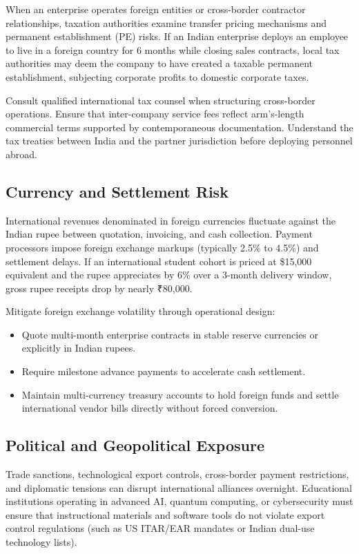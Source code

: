 When an enterprise operates foreign entities or cross-border contractor relationships, taxation authorities examine transfer pricing mechanisms and permanent establishment (PE) risks. If an Indian enterprise deploys an employee to live in a foreign country for 6 months while closing sales contracts, local tax authorities may deem the company to have created a taxable permanent establishment, subjecting corporate profits to domestic corporate taxes.

Consult qualified international tax counsel when structuring cross-border operations. Ensure that inter-company service fees reflect arm's-length commercial terms supported by contemporaneous documentation. Understand the tax treaties between India and the partner jurisdiction before deploying personnel abroad.

\subsection{Currency and Settlement Risk}
\label{sec:currency_and_settlement_risk}

International revenues denominated in foreign currencies fluctuate against the Indian rupee between quotation, invoicing, and cash collection. Payment processors impose foreign exchange markups (typically 2.5\% to 4.5\%) and settlement delays. If an international student cohort is priced at \$15,000 equivalent and the rupee appreciates by 6\% over a 3-month delivery window, gross rupee receipts drop by nearly ₹80,000.

Mitigate foreign exchange volatility through operational design:
\begin{itemize}
\item Quote multi-month enterprise contracts in stable reserve currencies or explicitly in Indian rupees.
\item Require milestone advance payments to accelerate cash settlement.
\item Maintain multi-currency treasury accounts to hold foreign funds and settle international vendor bills directly without forced conversion.
\end{itemize}

\subsection{Political and Geopolitical Exposure}
\label{sec:political_geopolitical_exposure}

Trade sanctions, technological export controls, cross-border payment restrictions, and diplomatic tensions can disrupt international alliances overnight. Educational institutions operating in advanced AI, quantum computing, or cybersecurity must ensure that instructional materials and software tools do not violate export control regulations (such as US ITAR/EAR mandates or Indian dual-use technology lists).

